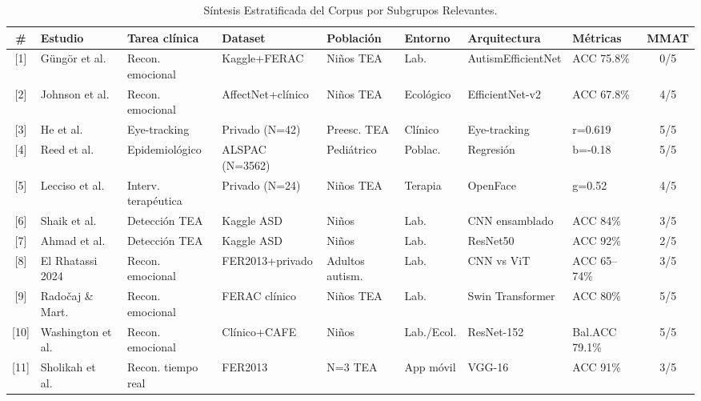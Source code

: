 \documentclass[ASNA,twocolumn]{USG}
\begin{document}
	\begin{table}[!t]
		\centering
		\caption{Síntesis Estratificada del Corpus por Subgrupos Relevantes.\label{tab17}}
		{\footnotesize\setlength{\tabcolsep}{2pt}
			\begin{tabular*}{\textwidth}{@{\extracolsep\fill}clllllllc@{\extracolsep\fill}}
				\toprule
				\textbf{\#} & \textbf{Estudio} & \textbf{Tarea clínica} & \textbf{Dataset} &
				\textbf{Población} & \textbf{Entorno} & \textbf{Arquitectura} &
				\textbf{Métricas} & \textbf{MMAT} \\
				\midrule
				{[1]}  & Güngör et al.\      & Recon. emocional    & Kaggle+FERAC       & Niños TEA       & Lab.       & AutismEfficientNet    & ACC 75.8\%     & 0/5 \\
				{[2]}  & Johnson et al.\     & Recon. emocional    & AffectNet+clínico  & Niños TEA       & Ecológico  & EfficientNet-v2       & ACC 67.8\%     & 4/5 \\
				{[3]}  & He et al.\          & Eye-tracking        & Privado (N=42)     & Preesc. TEA     & Clínico    & Eye-tracking          & r=0.619        & 5/5 \\
				{[4]}  & Reed et al.\        & Epidemiológico      & ALSPAC (N=3562)    & Pediátrico      & Poblac.    & Regresión             & b=-0.18        & 5/5 \\
				{[5]}  & Lecciso et al.\     & Interv. terapéutica & Privado (N=24)     & Niños TEA       & Terapia    & OpenFace              & g=0.52         & 4/5 \\
				{[6]}  & Shaik et al.\       & Detección TEA       & Kaggle ASD         & Niños           & Lab.       & CNN ensamblado        & ACC 84\%       & 3/5 \\
				{[7]}  & Ahmad et al.\       & Detección TEA       & Kaggle ASD         & Niños           & Lab.       & ResNet50              & ACC 92\%       & 2/5 \\
				{[8]}  & El Rhatassi 2024    & Recon. emocional    & FER2013+privado    & Adultos autism. & Lab.       & CNN vs ViT            & ACC 65--74\%   & 3/5 \\
				{[9]}  & Radočaj \& Mart.\   & Recon. emocional    & FERAC clínico      & Niños TEA       & Lab.       & Swin Transformer      & ACC 80\%       & 5/5 \\
				{[10]} & Washington et al.\  & Recon. emocional    & Clínico+CAFE       & Niños           & Lab./Ecol. & ResNet-152            & Bal.ACC 79.1\% & 5/5 \\
				{[11]} & Sholikah et al.\    & Recon. tiempo real  & FER2013            & N=3 TEA         & App móvil  & VGG-16                & ACC 91\%       & 3/5 \\

\end{tabular*}}
\end{table}
\end{document}
